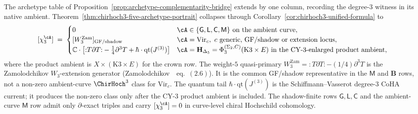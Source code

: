 \begin{remark}
\label{rem:chirhoch3-archetype-column}
The archetype table of
Proposition~\textup{\ref{prop:archetype-complementarity-bridge}}
extends by one column, recording the degree-$3$ witness in its
native ambient. Theorem~\ref{thm:chirhoch3-five-archetype-portrait}
collapses through
Corollary~\ref{cor:chirhoch3-unified-formula} to
\[
 [\chi_3^{\cA}]\;=\;
 \begin{cases}
 0 & \cA\in\{\mathsf G,\mathsf L,\mathsf C,\mathsf M\}
      \text{ on the ambient curve}, \\
[W_3^{\mathrm{Zam}}]_{\mathrm{GF/shadow}} &
\cA=\mathrm{Vir}_c,\ c\text{ generic, GF/shadow or extension locus}, \\
 \mathbb C\cdot\bigl[{:}T\partial T{:}-\tfrac14\partial^3 T+
 \hbar\cdot\mathrm{qt}(J^{(3)})\bigr] &
 \cA=\mathbf H_{\Delta_5}=\Phi_3^{(\Sigma_2,C)}(\mathrm{K3}\times E)
      \text{ in the CY-$3$-enlarged product ambient},
 \end{cases}
\]
where the product ambient is $X\times(\mathrm{K3}\times E)$ for
the crown row. The weight-$5$ quasi-primary
$W_3^{\mathrm{Zam}}={:}T\partial T{:}-(1/4)\partial^3 T$ is the
Zamolodchikov $W_3$-extension generator
(Zamolodchikov~\textup{\cite{Zam1985}}~eq.~$(2.6)$). It is the
common GF/shadow representative in the $\mathsf M$ and $\mathbf B$
rows, not a non-zero ambient-curve $\ChirHoch^3$ class for
$\mathrm{Vir}_c$. The quantum tail
$\hbar\cdot\mathrm{qt}(J^{(3)})$ is the Schiffmann--Vasserot
degree-$3$ CoHA current; it produces the non-zero class only after
the CY-$3$ product ambient is included. The shadow-finite rows
$\mathsf G,\mathsf L,\mathsf C$ and the ambient-curve
$\mathsf M$ row admit only $\partial$-exact triples and carry
$[\chi_3^{\cA}]=0$ in curve-level chiral Hochschild cohomology.
\end{remark}

